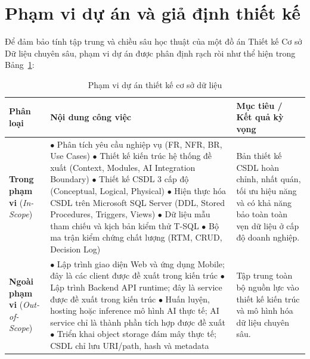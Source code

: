 \section{Phạm vi dự án và giả định thiết kế}
\label{s:c1_scope}

Để đảm bảo tính tập trung và chiều sâu học thuật của một đồ án Thiết kế Cơ sở Dữ liệu chuyên sâu, phạm vi dự án được phân định rạch ròi như thể hiện trong Bảng~\ref{tab:c1_scope}:

\begin{table}[!ht]
\centering
\caption{Phạm vi dự án thiết kế cơ sở dữ liệu}
\label{tab:c1_scope}
\small
\begin{tabularx}{\textwidth}{p{3.0cm}p{6.0cm}>{\raggedright\arraybackslash}X}
\toprule
\textbf{Phân loại} & \textbf{Nội dung công việc} & \textbf{Mục tiêu / Kết quả kỳ vọng} \\
\midrule
\textbf{Trong phạm vi} \newline (\textit{In-Scope}) & 
$\bullet$ Phân tích yêu cầu nghiệp vụ (FR, NFR, BR, Use Cases) \newline
$\bullet$ Thiết kế kiến trúc hệ thống đề xuất (Context, Modules, AI Integration Boundary) \newline
$\bullet$ Thiết kế CSDL 3 cấp độ (Conceptual, Logical, Physical) \newline
$\bullet$ Hiện thực hóa CSDL trên Microsoft SQL Server (DDL, Stored Procedures, Triggers, Views) \newline
$\bullet$ Dữ liệu mẫu tham chiếu và kịch bản kiểm thử T-SQL \newline
$\bullet$ Bộ ma trận kiểm chứng chất lượng (RTM, CRUD, Decision Log) &
Bản thiết kế CSDL hoàn chỉnh, nhất quán, tối ưu hiệu năng và có khả năng bảo toàn toàn vẹn dữ liệu ở cấp độ doanh nghiệp. \\
\midrule
\textbf{Ngoài phạm vi} \newline (\textit{Out-of-Scope}) & 
$\bullet$ Lập trình giao diện Web và ứng dụng Mobile; đây là các client được đề xuất trong kiến trúc \newline
$\bullet$ Lập trình Backend API runtime; đây là service được đề xuất trong kiến trúc \newline
$\bullet$ Huấn luyện, hosting hoặc inference mô hình AI thực tế; AI service chỉ là thành phần tích hợp được đề xuất \newline
$\bullet$ Triển khai object storage đám mây thực tế; CSDL chỉ lưu URI/path, hash và metadata &
Tập trung toàn bộ nguồn lực vào thiết kế kiến trúc và mô hình hóa dữ liệu chuyên sâu. \\
\bottomrule
\end{tabularx}
\end{table}

